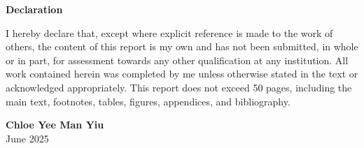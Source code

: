 \begin{titlepage}
    \centering
    \vspace*{1.5cm}
    {\large\bfseries Declaration \par}
    \vspace{1.5cm}
    \begin{flushleft}
    I hereby declare that, except where explicit reference is made to the work of others, the content of this report is my own and has not been submitted, in whole or in part, for assessment towards any other qualification at any institution. All work contained herein was completed by me unless otherwise stated in the text or acknowledged appropriately. This report does not exceed 50 pages, including the main text, footnotes, tables, figures, appendices, and bibliography.
    \end{flushleft}

    \vspace{1.5cm}
    \begin{flushright}
        \textbf{Chloe Yee Man Yiu}\\
        June 2025
    \end{flushright}
    \vfill
\end{titlepage}
